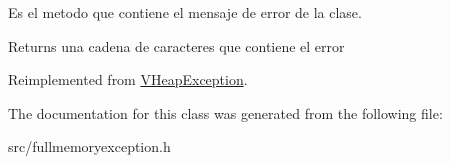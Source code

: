 Es el metodo que contiene el mensaje de error de la clase. 

\begin{DoxyReturn}{Returns}
una cadena de caracteres que contiene el error 
\end{DoxyReturn}


Reimplemented from \hyperlink{class_v_heap_exception_a58154e8dc02f9c28dfefad7897f8b2cf}{V\-Heap\-Exception}.



The documentation for this class was generated from the following file\-:\begin{DoxyCompactItemize}
\item 
src/fullmemoryexception.\-h\end{DoxyCompactItemize}

